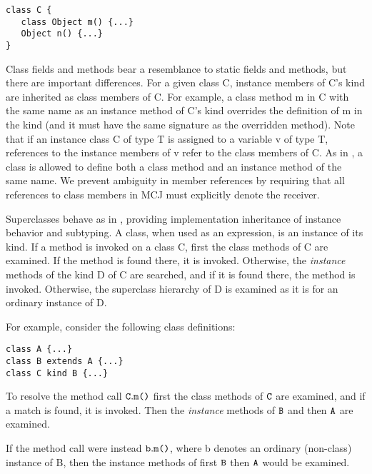 \documentclass{acm-sigplan}
\begin{document}
\begin{verbatim}
class C {
   class Object m() {...}
   Object n() {...}
}
\end{verbatim}

Class fields and methods bear a resemblance to static fields and
methods, but there are important differences. For a given class {\txt
C}, instance members of {\txt C}'s kind are inherited as class
members of {\txt C}. For example, a class method {\txt m} in {\txt C}
with the same name as an instance method of {\txt C}'s kind
overrides the definition of {\txt m} in the kind (and it must have the
same signature as the overridden method). Note that if an instance
class {\txt C} of type {\txt T} is assigned to a variable {\txt v} of
type {\txt T}, references to the instance members of {\txt v} refer to
the class members of {\txt C}.  As in \cite{DimUnits}, a class is
allowed to define both a class method and an instance method of the
same name. We prevent ambiguity in member references by requiring that
all references to class members in MCJ must explicitly denote the
receiver.

Superclasses behave as in \FGJ, providing implementation inheritance
of instance behavior and subtyping. A class, when used as an
expression, is an instance of its kind.  If a method is invoked on a
class {\txt C}, first the class methods of {\txt C} are examined.  If
the method is found there, it is invoked. Otherwise, the
\emph{instance} methods of the kind {\txt D} of {\txt C} are searched,
and if it is found there, the method is invoked.  Otherwise, the
superclass hierarchy of {\txt D} is examined as it is for an ordinary
instance of {\txt D}.

For example, consider the following class definitions:

\begin{verbatim}
class A {...}
class B extends A {...}
class C kind B {...}
\end{verbatim}

To resolve the method call ${\mathtt{{C}}}{\mathtt .}{\mbox {\tt m}\mbox{\tt (}{\overline{{}}}\mbox{\tt )}}$ first the class
methods of $\mathtt{{C}}$ are examined, and if a match is found, it is invoked.
Then the \emph{instance} methods of $\mbox {\tt B}$ and then $\mbox {\tt A}$ are examined.

If the method call were instead ${\mbox {\tt b}}{\mathtt .}{\mbox {\tt m}\mbox{\tt (}{\overline{{}}}\mbox{\tt )}}$, where {\txt
b} denotes an ordinary (non-class) instance of {\txt B}, then the
instance methods of first $\mbox {\tt B}$ then $\mbox {\tt A}$ would be examined.

\end{document}
